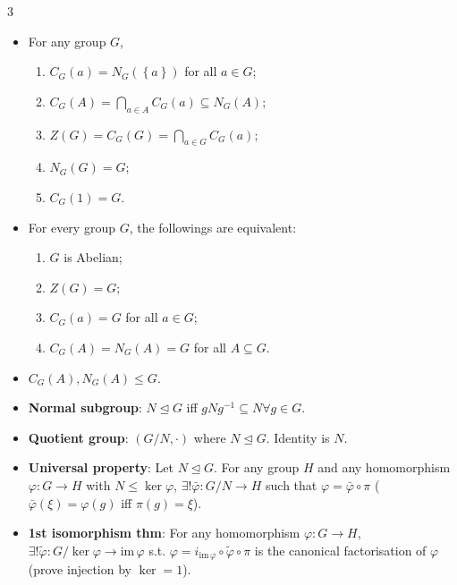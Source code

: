 \documentclass[10pt]{article}
\begin{document}
\begin{multicols*}{3}
\begin{itemize}
            \item For any group $G$, 
            \begin{enumerate}
                \item $C_G\left(a\right) = N_G\left(\left\{a\right\}\right)$ for all $a \in G$;
                \item $C_G\left(A\right) = \bigcap_{a \in A}C_G\left(a\right) \subseteq N_G\left(A\right)$;
                \item $Z\left(G\right) = C_G\left(G\right) = \bigcap_{a \in G}C_G\left(a\right)$;
                \item $N_G\left(G\right) = G$;
                \item $C_G\left(1\right) = G$.
            \end{enumerate}
            \item For every group $G$, the followings are equivalent:
            \begin{enumerate}
                \item $G$ is Abelian;
                \item $Z\left(G\right) = G$;
                \item $C_G\left(a\right) = G$ for all $a \in G$;
                \item $C_G\left(A\right) = N_G\left(A\right) = G$ for all $A \subseteq G$.
            \end{enumerate}
            \item $C_G\left(A\right), N_G\left(A\right) \leq G$.
            \item \textbf{Normal subgroup}: $N \trianglelefteq G$ iff $gNg^{-1} \subseteq N \forall g \in G$.
            \item \textbf{Quotient group}: $\left(G \slash N, \cdot\right)$ where $N \trianglelefteq G$. Identity is $N$.
            \item \textbf{Universal property}: Let $N \trianglelefteq G$. For any group $H$ and any homomorphism $\varphi \colon G \to H$ with $N \leq \ker{\varphi}$, $\exists! \bar{\varphi} \colon G \slash N \to H$ such that $\varphi = \bar{\varphi} \circ \pi$ ($\bar{\varphi}\left(\xi\right) = \varphi\left(g\right)$ iff $\pi\left(g\right) = \xi$).
            \item \textbf{1st isomorphism thm}: For any homomorphism $\varphi \colon G \to H$, $\exists! \tilde{\varphi} \colon G \slash \ker{\varphi} \to \mathrm{im}\,{\varphi}$ s.t. $\varphi = i_{\mathrm{im}\,{\varphi}} \circ \tilde{\varphi} \circ \pi$ is the canonical factorisation of $\varphi$ (prove injection by $\ker = 1$).

\end{itemize}
\end{multicols*}
\end{document}
